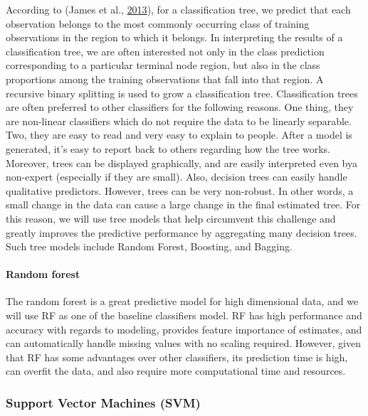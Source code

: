 \documentclass[
  10pt,
]{article}
\begin{document}
According to (James et al., \protect\hyperlink{ref-james2013introduction}{2013}), for a classification tree, we predict that each observation belongs to the most commonly occurring class of training observations in the region to which it belongs. In interpreting the results of a classification tree, we are often interested not only in the class prediction corresponding to a particular terminal node region, but also in the class proportions among the training observations that fall into that region. A recursive binary splitting is used to grow a classification tree. Classification trees are often preferred to other classifiers for the following reasons. One thing, they are non-linear classifiers which do not require the data to be linearly separable. Two, they are easy to read and very easy to explain to people. After a model is generated, it's easy to report back to others regarding how the tree works. Moreover, trees can be displayed graphically, and are easily interpreted even bya non-expert (especially if they are small). Also, decision trees can easily handle qualitative predictors. However, trees can be very non-robust. In other words, a small change in the data can cause a large change in the final estimated tree. For this reason, we will use tree models that help circumvent this challenge and greatly improves the predictive performance by aggregating many decision trees. Such tree models include Random Forest, Boosting, and Bagging.

\paragraph{Random forest}

The random forest is a great predictive model for high dimensional data, and we will use RF as one of the baseline classifiers model. RF has high performance and accuracy with regards to modeling, provides feature importance of estimates, and can automatically handle missing values with no scaling required. However, given that RF has some advantages over other classifiers, its prediction time is high, can overfit the data, and also require more computational time and resources.

\subsubsection{Support Vector Machines (SVM)}
\end{document}
